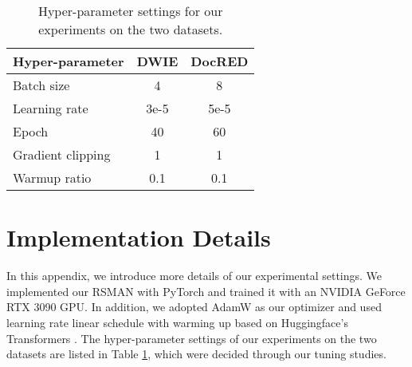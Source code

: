 \documentclass[11pt]{article}
\begin{document}
\begin{table}[htbp]
  \centering
    \begin{tabular}{lcc}
    \toprule
    Hyper-parameter & \multicolumn{1}{l}{DWIE} & \multicolumn{1}{l}{ DocRED} \\
    \midrule
    Batch size & 4     & 8 \\
    Learning rate & {3e-5} & {5e-5} \\
    Epoch & 40    & 60 \\
    Gradient clipping & 1     & 1 \\
    Warmup ratio & 0.1   & 0.1 \\
    \bottomrule
    \end{tabular}\caption{Hyper-parameter settings for our experiments on the two datasets.}
  \label{parameter}\end{table}

\section{Implementation Details}
\label{sec:details}

In this appendix, we introduce more details of our experimental settings. We implemented our RSMAN with PyTorch and trained it with an NVIDIA GeForce RTX 3090 GPU. In addition, we adopted AdamW \cite{loshchilov2018decoupled} as our optimizer and used learning rate linear schedule with warming up based on Huggingface’s Transformers \cite{wolf2019huggingface}.
The hyper-parameter settings of our experiments on the two datasets are listed in Table \ref{parameter}, which were decided through our tuning studies.
\end{document}
